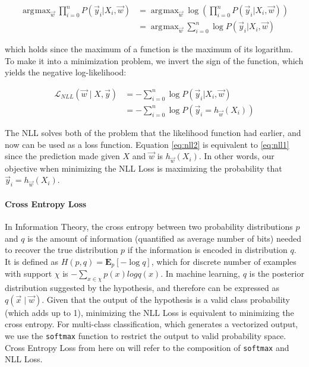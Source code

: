 \documentclass[12pt,a4paper,]{report}
\DeclareMathOperator*{\argmax}{arg\!\max}
\begin{document}
\begin{align}
    \argmax_{\vec{w}} \prod_{i = 0}^{n} P(\vec{y}_i |  X_i, \vec{w}) 
    &= \argmax_{\vec{w}} \log (\prod_{i = 0}^{n} P(\vec{y}_i |  X_i, \vec{w})) \\
    &= \argmax_{\vec{w}} \sum_{i = 0}^{n} \log P(\vec{y}_i |  X_i, \vec{w})
\end{align}

which holds since the maximum of a function is the maximum of its
logarithm. To make it into a minimization problem, we invert the sign of
the function, which yields the negative log-likelihood:

\begin{align}
    \mathcal{L}_{NLL}(\vec{w} \mid X, \vec{y}) &= - \sum_{i = 0}^{n} \log P(\vec{y}_i |  X_i, \vec{w}) \label{eq:nll1} \\
    &= - \sum_{i = 0}^{n} \log P(\vec{y}_i = h_{\vec{w}}(X_i)) \label{eq:nll2}
\end{align}

The NLL solves both of the problem that the likelihood function had
earlier, and now can be used as a loss function. Equation \ref{eq:nll2}
is equivalent to \ref{eq:nll1} since the prediction made given \(X\) and
\(\vec{w}\) is \(h_{\vec{w}}(X_i)\). In other words, our objective when
minimizing the NLL Loss is maximizing the probability that
\(\vec{y}_i = h_{\vec{w}}(X_i)\).

\paragraph{Cross Entropy Loss}

In Information Theory, the cross entropy between two probability
distributions \(p\) and \(q\) is the amount of information (quantified
as average number of bits) needed to recover the true distribution \(p\)
if the information is encoded in distribution \(q\). It is defined as
\(H(p, q) = \mathbf{E}_p[- \log q]\), which for discrete number of
examples with support \(\chi\) is \(- \sum_{x \in \chi} p(x) log q(x)\).
In machine learning, \(q\) is the posterior distribution suggested by
the hypothesis, and therefore can be expressed as
\(q(\vec{x} \mid \vec{w})\). Given that the output of the hypothesis is
a valid class probability (which adds up to 1), minimizing the NLL Loss
is equivalent to minimizing the cross entropy. For multi-class
classification, which generates a vectorized output, we use the
\texttt{softmax} function to restrict the output to valid probability
space. Cross Entropy Loss from here on will refer to the composition of
\texttt{softmax} and NLL Loss.
\end{document}
